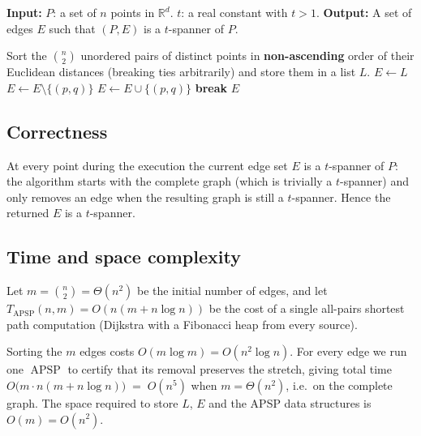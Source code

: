 \documentclass{cccg26}
\DeclareMathOperator{\APSP}{APSP}
\begin{document}
\begin{algorithm*}[h]
\caption{Descending Greedy Filter (DGF)}
\label{alg:dgf}
\begin{algorithmic}[1]
\Statex \textbf{Input:}
\Statex \hspace{1cm} $P$: a set of $n$ points in $\mathbb{R}^d$.
\Statex \hspace{1cm} $t$: a real constant with $t>1$.
\Statex \textbf{Output:}
\Statex \hspace{1cm} A set of edges $E$ such that $(P,E)$ is a $t$-spanner of $P$.

\State Sort the $\binom{n}{2}$ unordered pairs of distinct points in \textbf{non-ascending} order of
       their Euclidean distances (breaking ties arbitrarily) and store them in a list $L$.
\State $E \leftarrow L$
    \State $E \leftarrow E \setminus \{(p,q)\}$
            \State $E \leftarrow E \cup \{(p,q)\}$
            \State \textbf{break}
        \EndIf
    \EndFor
\EndFor
\State \Return $E$
\end{algorithmic}
\end{algorithm*}

\subsection{Correctness}
At every point during the execution the current edge set $E$ is a
$t$-spanner of $P$: the algorithm starts with the complete graph (which
is trivially a $t$-spanner) and only removes an edge when the resulting
graph is still a $t$-spanner. Hence the returned $E$ is a $t$-spanner.

\subsection{Time and space complexity}
Let $m=\binom{n}{2}=\Theta(n^2)$ be the initial number of edges, and
let $T_{\APSP}(n,m)=O(n(m+n\log n))$ be the cost of a single
all-pairs shortest path computation (Dijkstra with a Fibonacci heap
from every source).

Sorting the $m$ edges costs $O(m\log m)=O(n^2 \log n)$.
For every edge we run one $\APSP$ to certify that its removal
preserves the stretch, giving total time
$O\bigl(m\cdot n(m+n\log n)\bigr) \;=\; O(n^5)$
when $m=\Theta(n^2)$, i.e.\ on the complete graph. The space required
to store $L$, $E$ and the APSP data structures is $O(m)=O(n^2)$.
\end{document}
